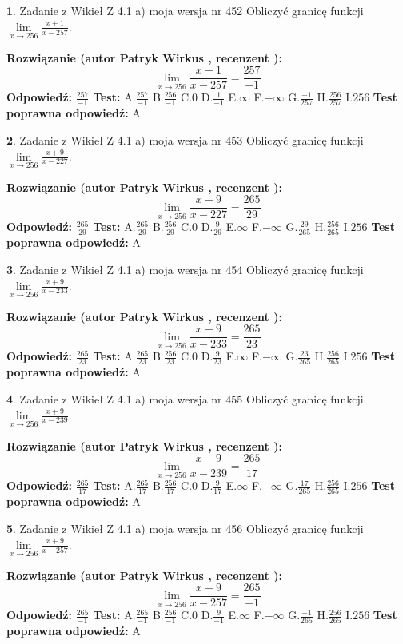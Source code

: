 \documentclass[12pt, a4paper]{article}
\theoremstyle{definition} %
\newtheorem{zad}{}
\newcommand{\zadStart}[1]{\begin{zad}#1\newline}
\newcommand{\zadStop}{\end{zad}}
\newcommand{\rozwStart}[2]{\noindent \textbf{Rozwiązanie (autor #1 , recenzent #2): }\newline}
\newcommand{\rozwStop}{\newline}
\newcommand{\odpStart}{\noindent \textbf{Odpowiedź:}\newline}
\newcommand{\odpStop}{\newline}
\newcommand{\testStart}{\noindent \textbf{Test:}\newline}
\newcommand{\testStop}{\newline}
\newcommand{\kluczStart}{\noindent \textbf{Test poprawna odpowiedź:}\newline}
\newcommand{\kluczStop}{\newline}
\begin{document}
\zadStart{Zadanie z Wikieł Z 4.1 a) moja wersja nr 452}
Obliczyć granicę funkcji $\lim\limits_{x\to256}\frac{x+1}{x-257}$.
\zadStop
\rozwStart{Patryk Wirkus}{}
$$\lim\limits_{x\to256}\frac{x+1}{x-257} = \frac{257}{-1}$$
\rozwStop
\odpStart
$\frac{257}{-1}$
\odpStop
\testStart
A.$\frac{257}{-1}$
B.$\frac{256}{-1}$
C.$0$
D.$\frac{1}{-1}$
E.$\infty$
F.$-\infty$
G.$\frac{-1}{257}$
H.$\frac{256}{257}$
I.$256$
\testStop
\kluczStart
A
\kluczStop



\zadStart{Zadanie z Wikieł Z 4.1 a) moja wersja nr 453}
Obliczyć granicę funkcji $\lim\limits_{x\to256}\frac{x+9}{x-227}$.
\zadStop
\rozwStart{Patryk Wirkus}{}
$$\lim\limits_{x\to256}\frac{x+9}{x-227} = \frac{265}{29}$$
\rozwStop
\odpStart
$\frac{265}{29}$
\odpStop
\testStart
A.$\frac{265}{29}$
B.$\frac{256}{29}$
C.$0$
D.$\frac{9}{29}$
E.$\infty$
F.$-\infty$
G.$\frac{29}{265}$
H.$\frac{256}{265}$
I.$256$
\testStop
\kluczStart
A
\kluczStop



\zadStart{Zadanie z Wikieł Z 4.1 a) moja wersja nr 454}
Obliczyć granicę funkcji $\lim\limits_{x\to256}\frac{x+9}{x-233}$.
\zadStop
\rozwStart{Patryk Wirkus}{}
$$\lim\limits_{x\to256}\frac{x+9}{x-233} = \frac{265}{23}$$
\rozwStop
\odpStart
$\frac{265}{23}$
\odpStop
\testStart
A.$\frac{265}{23}$
B.$\frac{256}{23}$
C.$0$
D.$\frac{9}{23}$
E.$\infty$
F.$-\infty$
G.$\frac{23}{265}$
H.$\frac{256}{265}$
I.$256$
\testStop
\kluczStart
A
\kluczStop



\zadStart{Zadanie z Wikieł Z 4.1 a) moja wersja nr 455}
Obliczyć granicę funkcji $\lim\limits_{x\to256}\frac{x+9}{x-239}$.
\zadStop
\rozwStart{Patryk Wirkus}{}
$$\lim\limits_{x\to256}\frac{x+9}{x-239} = \frac{265}{17}$$
\rozwStop
\odpStart
$\frac{265}{17}$
\odpStop
\testStart
A.$\frac{265}{17}$
B.$\frac{256}{17}$
C.$0$
D.$\frac{9}{17}$
E.$\infty$
F.$-\infty$
G.$\frac{17}{265}$
H.$\frac{256}{265}$
I.$256$
\testStop
\kluczStart
A
\kluczStop



\zadStart{Zadanie z Wikieł Z 4.1 a) moja wersja nr 456}
Obliczyć granicę funkcji $\lim\limits_{x\to256}\frac{x+9}{x-257}$.
\zadStop
\rozwStart{Patryk Wirkus}{}
$$\lim\limits_{x\to256}\frac{x+9}{x-257} = \frac{265}{-1}$$
\rozwStop
\odpStart
$\frac{265}{-1}$
\odpStop
\testStart
A.$\frac{265}{-1}$
B.$\frac{256}{-1}$
C.$0$
D.$\frac{9}{-1}$
E.$\infty$
F.$-\infty$
G.$\frac{-1}{265}$
H.$\frac{256}{265}$
I.$256$
\testStop
\kluczStart
A
\kluczStop
\end{document}
